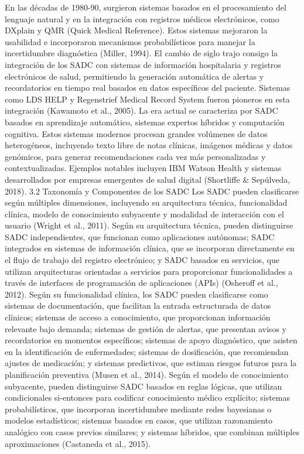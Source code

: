 \documentclass{article}
\begin{document}
\begin{multicols}{2}
En las décadas de 1980-90, surgieron sistemas basados en el procesamiento del lenguaje natural y en la integración con registros médicos electrónicos, como DXplain y QMR (Quick Medical Reference). Estos sistemas mejoraron la usabilidad e incorporaron mecanismos probabilísticos para manejar la incertidumbre diagnóstica (Miller, 1994).
El cambio de siglo trajo consigo la integración de los SADC con sistemas de información hospitalaria y registros electrónicos de salud, permitiendo la generación automática de alertas y recordatorios en tiempo real basados en datos específicos del paciente. Sistemas como LDS HELP y Regenstrief Medical Record System fueron pioneros en esta integración (Kawamoto et al., 2005).
La era actual se caracteriza por SADC basados en aprendizaje automático, sistemas expertos híbridos y computación cognitiva. Estos sistemas modernos procesan grandes volúmenes de datos heterogéneos, incluyendo texto libre de notas clínicas, imágenes médicas y datos genómicos, para generar recomendaciones cada vez más personalizadas y contextualizadas. Ejemplos notables incluyen IBM Watson Health y sistemas desarrollados por empresas emergentes de salud digital (Shortliffe \& Sepúlveda, 2018).
 3.2 Taxonomía y Componentes de los SADC
Los SADC pueden clasificarse según múltiples dimensiones, incluyendo su arquitectura técnica, funcionalidad clínica, modelo de conocimiento subyacente y modalidad de interacción con el usuario (Wright et al., 2011).
Según su arquitectura técnica, pueden distinguirse SADC independientes, que funcionan como aplicaciones autónomas; SADC integrados en sistemas de información clínica, que se incorporan directamente en el flujo de trabajo del registro electrónico; y SADC basados en servicios, que utilizan arquitecturas orientadas a servicios para proporcionar funcionalidades a través de interfaces de programación de aplicaciones (APIs) (Osheroff et al., 2012).
Según su funcionalidad clínica, los SADC pueden clasificarse como sistemas de documentación, que facilitan la entrada estructurada de datos clínicos; sistemas de acceso a conocimiento, que proporcionan información relevante bajo demanda; sistemas de gestión de alertas, que presentan avisos y recordatorios en momentos específicos; sistemas de apoyo diagnóstico, que asisten en la identificación de enfermedades; sistemas de dosificación, que recomiendan ajustes de medicación; y sistemas predictivos, que estiman riesgos futuros para la planificación preventiva (Musen et al., 2014).
Según el modelo de conocimiento subyacente, pueden distinguirse SADC basados en reglas lógicas, que utilizan condicionales si-entonces para codificar conocimiento médico explícito; sistemas probabilísticos, que incorporan incertidumbre mediante redes bayesianas o modelos estadísticos; sistemas basados en casos, que utilizan razonamiento analógico con casos previos similares; y sistemas híbridos, que combinan múltiples aproximaciones (Castaneda et al., 2015).

\end{multicols}
\end{document}
